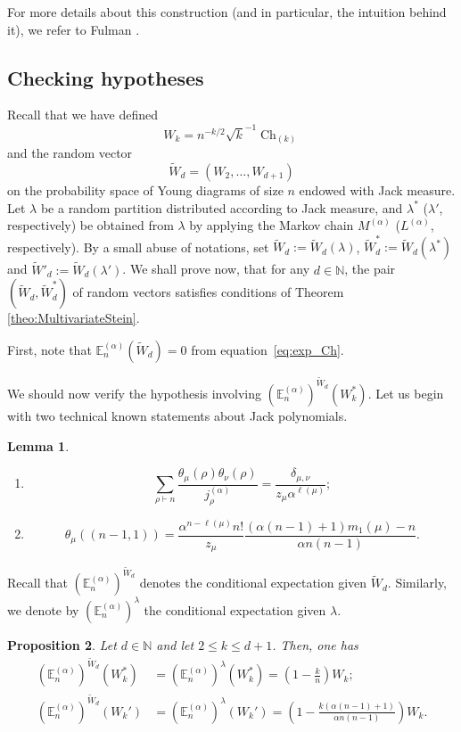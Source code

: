 \documentclass[11pt]{amsart}
\theoremstyle{plain}
\newtheorem{lemma}{Lemma}[section]
\newtheorem{proposition}[lemma]{Proposition}
\theoremstyle{remark}
\newcommand{\N}{\mathbb{N}}
\newcommand{\esper}{\mathbb{E}}
\DeclareMathOperator{\Ch}{Ch}
\begin{document}
For more details about this construction (and in particular, the intuition behind it),
we refer to Fulman \cite{FulmanFluctuationChA2}.


\subsection{Checking hypotheses}
\label{subsec:CheckingHypotheses}

Recall that we have defined
\[ W_k = n^{-k/2} \sqrt{k}^{-1} \Ch_{(k)} \]
and the random vector
\[ \tilde{W}_d = (W_2,\dots,W_{d+1})\]
on the probability space of Young diagrams of size $n$ endowed with Jack measure.
Let $\lambda$ be a random partition distributed according to Jack measure,
and $\lambda^*$ ($\lambda'$, respectively) be obtained from $\lambda$ by applying
the Markov chain $M^{(\alpha)}$ ($L^{(\alpha)}$, respectively).
By a small abuse of notations, 
set $\tilde{W}_d:=\tilde{W}_d(\lambda)$, 
$\tilde{W}_d^*:=\tilde{W}_d(\lambda^*)$
and $\tilde{W}'_d:=\tilde{W}_d(\lambda')$.
We shall prove now, that for any $d \in \N$,
the pair $(\tilde{W}_d, \tilde{W}_d^*)$ of random vectors 
satisfies conditions of Theorem \ref{theo:MultivariateStein}.\medskip 

First, note that $\esper_n^{(\alpha)}(\tilde{W}_d)=0$ from equation~\eqref{eq:exp_Ch}.

We should now verify the hypothesis involving $(\esper_n^{(\alpha)})^{\tilde{W}_d}(W_k^*)$.
Let us begin with two technical known statements about Jack polynomials.
\begin{lemma}
\label{lem:identities}
\begin{enumerate}
\item{\cite[Page 382]{Macdonald1995}}
\label{eq:orthogonality}
\[ \sum_{\rho \vdash n} \frac{\theta_\mu(\rho)\theta_\nu(\rho)}{j^{(\alpha)}_\rho} =  \frac{\delta_{\mu,\nu}}{z_\mu \alpha^{\ell(\mu)}};\]
\item{\cite[Page 107]{Stanley1989}}
\label{eq:(n-1,1)}
\[ \theta_\mu((n-1,1)) = \frac{\alpha^{n-\ell(\mu)}n!}{z_\mu}\frac{(\alpha(n-1)+1)m_1(\mu) - n}{\alpha n(n-1)}.\]
\end{enumerate}
\end{lemma}


Recall that $(\esper_n^{(\alpha)})^{\tilde{W}_d}$ denotes the conditional
expectation given $\tilde{W}_d$.
Similarly, we denote by $(\esper_n^{(\alpha)})^{\lambda}$ the conditional
expectation given $\lambda$.

\begin{proposition}
\label{prop:SteinCondition1}
Let $d \in \N$ and let $2 \leq k \leq d+1$. Then, one has
\begin{align*}
    (\esper_n^{(\alpha)})^{\tilde{W}_d}(W_k^*) &=
(\esper_n^{(\alpha)})^{\lambda}(W_k^*) = \left(1-\frac{k}{n}\right)W_k ; \\
    (\esper_n^{(\alpha)})^{\tilde{W}_d}(W_k') &=
 (\esper_n^{(\alpha)})^{\lambda}(W_k') = \left(1-\frac{k(\alpha(n-1)+1)}{\alpha n(n-1)}\right)W_k.
 \end{align*}
\end{proposition}
\end{document}
